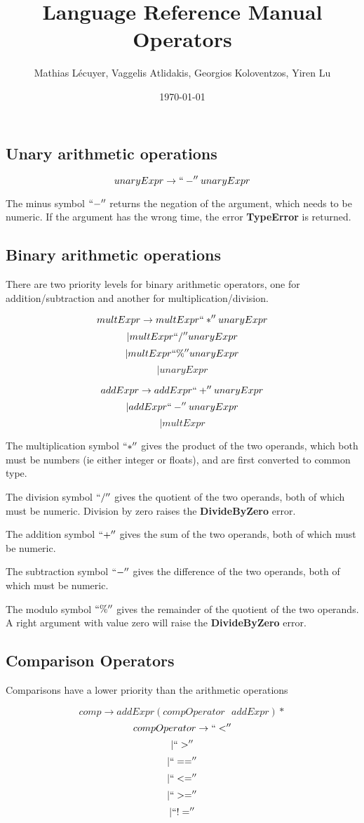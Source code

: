 \documentclass[12pt]{article}
\title{Language Reference Manual Operators}
\author{Mathias Lécuyer, Vaggelis Atlidakis, Georgios Koloventzos, Yiren Lu}
\date{\today}
\begin{document}
\subsection{Unary arithmetic operations}

$$unaryExpr \rightarrow ``-'' unaryExpr$$

The minus symbol $``-''$ returns the negation of the argument, which needs to be numeric. If the argument has the wrong time, the error \textbf{TypeError} is returned.

\subsection{Binary arithmetic operations}

There are two priority levels for binary arithmetic operators, one for addition/subtraction and another for multiplication/division.

$$multExpr \rightarrow multExpr ``*'' unaryExpr$$
$$ \vert multExpr ``/'' unaryExpr$$
$$ \vert multExpr ``\%'' unaryExpr$$
$$ \vert unaryExpr$$

$$addExpr \rightarrow addExpr ``+'' unaryExpr $$ 
$$\vert addExpr ``-'' unaryExpr$$
$$\vert multExpr$$

The multiplication symbol $``*''$ gives the product of the two operands, which both must be numbers (ie either integer or floats), and are first converted to common type.

The division symbol $``/''$ gives the quotient of the two operands, both of which must be numeric. Division by zero raises the \textbf{DivideByZero} error.

The addition symbol $``+''$ gives the sum of the two operands, both of which must be numeric.

The subtraction symbol $``-''$ gives the difference of the two operands, both of which must be numeric.

The modulo symbol $``\%''$ gives the remainder of the quotient of the two operands. A right argument with value zero will raise the \textbf{DivideByZero} error.

\subsection{Comparison Operators}

Comparisons have a lower priority than the arithmetic operations

$$comp \rightarrow addExpr (compOperator \text{ } addExpr)*$$
$$compOperator \rightarrow ``<'' $$
$$\vert ``>'' $$
$$\vert ``=='' $$
$$\vert ``<='' $$
$$\vert ``>='' $$
$$\vert ``!=''$$
\end{document}
